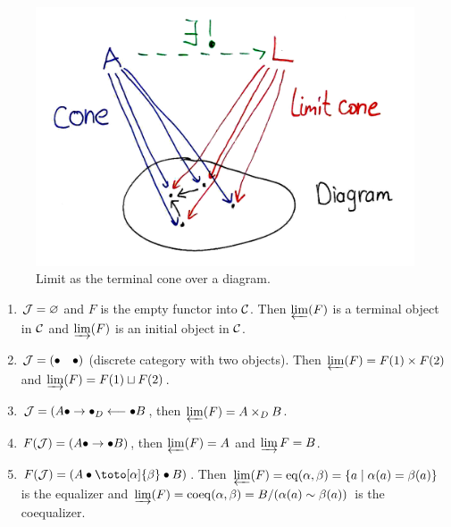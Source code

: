 \begin{figure}[tp]
    \centering
    \includegraphics[scale=0.15]{figures/limits.png}
    \caption{Limit as the terminal cone over a diagram.}
    \label{fig:limits}
\end{figure}
    
\begin{example}
\begin{enumerate}
    \item $\mathcal{J}=\varnothing$ and $F$ is the empty functor into $\mathcal{C}$. Then $\varprojlim(F)$ is a terminal object in $\mathcal{C}$ and $\varinjlim(F)$ is an initial object in $\mathcal{C}$.
    \item $\mathcal{J}=(\bullet\quad\bullet)$ (discrete category with two objects). Then $\varprojlim(F)=F(1)\times F(2)$ and $\varinjlim(F)=F(1)\sqcup F(2)$.
    \item $\mathcal{J}=(A\bullet\to \bullet_D\longleftarrow \bullet B$, then $\varprojlim(F)=A\times_D B$.
    \item $F(\mathcal{J})=(A\bullet\to \bullet B)$, then $\varprojlim(F)=A$ and $\varinjlim{F}=B$.
    \item $F(\calJ)=(A\bullet\toto[\alpha]{\beta}\bullet B)$. Then $\varprojlim(F)=\mathrm{eq}(\alpha,\beta)=\{a\mid \alpha(a)=\beta(a)\}$ is the equalizer and $\varinjlim(F)=\mathrm{coeq}(\alpha,\beta)=B/(\alpha(a)\sim \beta(a))$ is the coequalizer.

\end{enumerate}
\end{example} 

